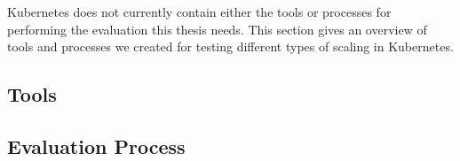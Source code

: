 Kubernetes does not currently contain either the tools or processes for
performing the evaluation this thesis needs.
This section gives an overview of tools and processes
we created for testing different types of scaling in Kubernetes.

\subsection{Tools}



\subsection{Evaluation Process}


